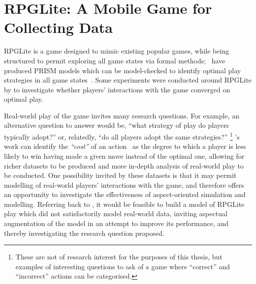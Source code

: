 \chapter{RPGLite: A Mobile Game for Collecting Data}\label{chap:rpglite}

 RPGLite is a game designed to mimic existing popular games,
while being structured to permit exploring all game states via formal
methods;
\citeauthor{kavanagh2020}~have produced PRISM models which can be model-checked
to identify optimal play strategies in all game
states~\cite{kavanagh2020}. Some
  experiments were conducted around RPGLite by \citet{kavanagh2021thesis} to
  investigate whether players' interactions with the game converged on optimal
  play.

Real-world play of the game invites many research questions. For example, an
alternative question to answer would be, ``what strategy of play do players
typically adopt?'' or, relatedly, ``do all players adopt the same strategies?''
\footnote{These are not of research interest for the purposes of this thesis,
but examples of interesting questions to ask of a game where ``correct'' and
``incorrect'' actions can be categorised.} \citeauthor{kavanagh2020}'s work can
identify the \emph{``cost''} of an action~\cite{kavanagh2020,kavanagh2021thesis}
as the degree to which a player is less likely to win having made a given move
instead of the optimal one, allowing for richer datasets to be produced and more
in-depth analysis of real-world play to be conducted. One possibility invited by
these datasets is that it may permit modelling of real-world players'
interactions with the game, and therefore offers an opportunity to investigate
the effectiveness of aspect-oriented simulation and modelling. Referring back to , it would be feasible to build a model of RPGLite play which did not
satisfactorily model real-world data, inviting aspectual augmentation of the
model in an attempt to improve its performance, and thereby investigating the
research question proposed.

